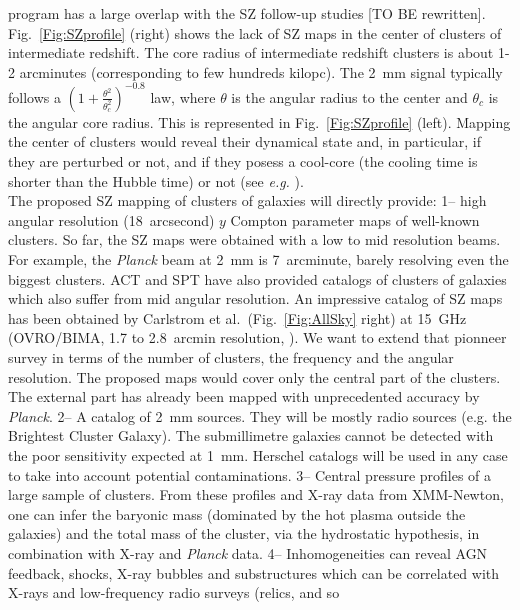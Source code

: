 \documentclass[10pt,a4paper,twoside,graphicx,color]{article}
\begin{document}
program has a large overlap with the SZ follow-up studies [TO BE
  rewritten]. Fig.~\ref{Fig:SZprofile} (right) shows the lack of SZ
maps in the center of clusters of intermediate redshift. The core
radius of intermediate redshift clusters is about 1-2 arcminutes
(corresponding to few hundreds kilopc). The 2~mm signal typically
follows a $(1+\frac{\theta^2}{\theta_c^2 })^{-0.8}$ law, where
$\theta$ is the angular radius to the center and $\theta_c$ is the
angular core radius. This is represented in Fig.~\ref{Fig:SZprofile}
(left). Mapping the center of clusters would reveal their dynamical
state and, in particular, if they are perturbed or not, and if they
posess a cool-core (the cooling time is shorter than the Hubble time)
or not (see {\sl e.g.} \cite{Hudson2010}). \\


\vspace{-0.1cm}  The
proposed SZ mapping of clusters of galaxies will directly provide: 1--
high angular resolution (18~arcsecond) $y$ Compton parameter maps of
well-known clusters. So far, the SZ maps were obtained with a low to
mid resolution beams. For example, the {\sl Planck} beam at 2~mm is
7~arcminute, barely resolving even the biggest clusters. ACT and SPT
have also provided catalogs of clusters of galaxies which also suffer
from mid angular resolution. An impressive catalog of SZ maps has been
obtained by Carlstrom et al.~(Fig.~\ref{Fig:AllSky} right) at 15~GHz
(OVRO/BIMA, 1.7 to 2.8~arcmin resolution, \cite{Reese2002}). We want
to extend that pionneer survey in terms of the number of clusters, the
frequency and the angular resolution. The proposed maps would cover
only the central part of the clusters. The external part has already
been mapped with unprecedented accuracy by {\sl Planck}. 2-- A catalog
of 2~mm sources. They will be mostly radio sources (e.g. the Brightest
Cluster Galaxy). The submillimetre galaxies cannot be detected with
the poor sensitivity expected at 1~mm. Herschel catalogs will be used
in any case to take into account potential contaminations. 3-- Central
pressure profiles of a large sample of clusters. From these profiles
and X-ray data from XMM-Newton, one can infer the baryonic mass
(dominated by the hot plasma outside the galaxies) and the total mass
of the cluster, via the hydrostatic hypothesis, in combination with
X-ray and {\sl Planck} data. 4-- Inhomogeneities can reveal AGN
feedback, shocks, X-ray bubbles and substructures which can be
correlated with X-rays and low-frequency radio surveys (relics, and so
\end{document}
